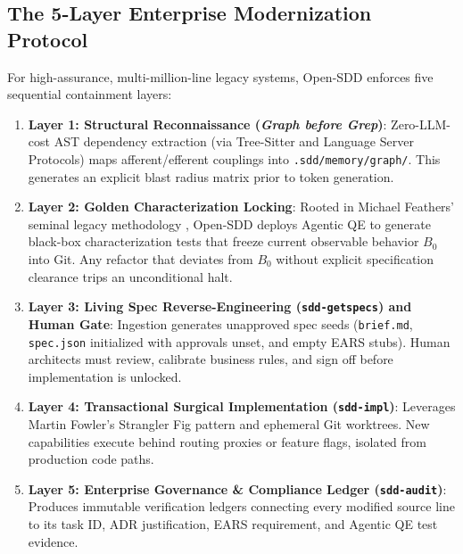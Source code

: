 \documentclass[11pt,a4paper]{article}
\begin{document}
\subsection{The 5-Layer Enterprise Modernization Protocol}
For high-assurance, multi-million-line legacy systems, Open-SDD enforces five sequential containment layers:
\begin{enumerate}
    \item \textbf{Layer 1: Structural Reconnaissance (\textit{Graph before Grep})}: Zero-LLM-cost AST dependency extraction (via Tree-Sitter and Language Server Protocols) maps afferent/efferent couplings into \texttt{.sdd/memory/graph/}. This generates an explicit blast radius matrix prior to token generation.
    \item \textbf{Layer 2: Golden Characterization Locking}: Rooted in Michael Feathers' seminal legacy methodology \cite{feathers2004working}, Open-SDD deploys Agentic QE to generate black-box characterization tests that freeze current observable behavior $B_0$ into Git. Any refactor that deviates from $B_0$ without explicit specification clearance trips an unconditional halt.
    \item \textbf{Layer 3: Living Spec Reverse-Engineering (\texttt{sdd-getspecs}) and Human Gate}: Ingestion generates unapproved spec seeds (\texttt{brief.md}, \texttt{spec.json} initialized with approvals unset, and empty EARS stubs). Human architects must review, calibrate business rules, and sign off before implementation is unlocked.
    \item \textbf{Layer 4: Transactional Surgical Implementation (\texttt{sdd-impl})}: Leverages Martin Fowler's Strangler Fig pattern \cite{fowler2004strangler} and ephemeral Git worktrees. New capabilities execute behind routing proxies or feature flags, isolated from production code paths.
    \item \textbf{Layer 5: Enterprise Governance \& Compliance Ledger (\texttt{sdd-audit})}: Produces immutable verification ledgers connecting every modified source line to its task ID, ADR justification, EARS requirement, and Agentic QE test evidence.
\end{enumerate}
\end{document}
